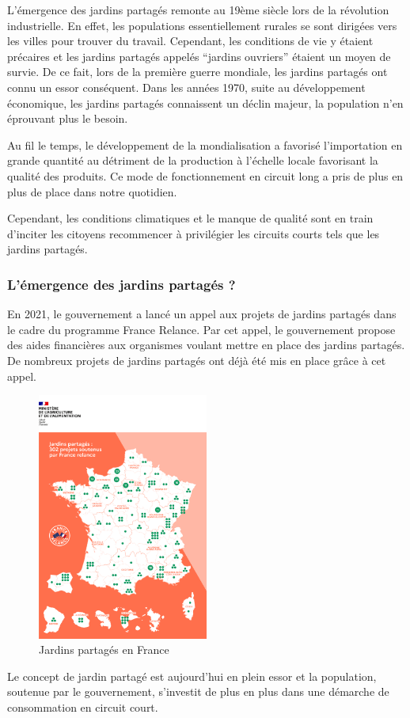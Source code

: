 \documentclass[french,a4paper]{article}
\begin{document}
L’émergence des jardins partagés remonte au 19ème siècle lors de la révolution industrielle. En effet, les populations essentiellement rurales se sont dirigées vers les villes pour trouver du travail. Cependant, les conditions de vie y étaient précaires et les jardins partagés appelés  “jardins ouvriers” étaient un moyen de survie. De ce fait, lors de la première guerre mondiale, les jardins partagés ont connu un essor conséquent. Dans les années 1970, suite au développement économique, les jardins partagés connaissent un déclin majeur, la population n'en éprouvant plus le besoin.

Au fil le temps, le développement de la mondialisation a favorisé l’importation en grande quantité au détriment de la production à l’échelle locale favorisant la qualité des produits. Ce mode de fonctionnement en circuit long a pris de plus en plus de place dans notre quotidien. 

Cependant, les conditions climatiques et le manque de qualité sont en train d'inciter les citoyens recommencer à privilégier les circuits courts tels que les jardins partagés.

\subsubsection{L'émergence des jardins partagés ?}

En 2021, le gouvernement a lancé un appel aux projets de jardins partagés dans le cadre du programme France Relance. Par cet appel, le gouvernement propose des aides financières aux organismes voulant mettre en place des jardins partagés. De nombreux projets de jardins partagés ont déjà été mis en place grâce à cet appel.
\begin{figure}[H]
    \centering
    \includegraphics[width=0.5\textwidth]{img/francerelance_carte.png}
    \caption{Jardins partagés en France}
\end{figure}
Le concept de jardin partagé est aujourd’hui en plein essor et la population, soutenue par le gouvernement, s’investit de plus en plus dans une démarche de consommation en circuit court. 
\end{document}
